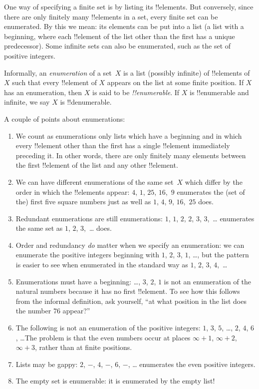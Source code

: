 \documentclass[../../../include/open-logic-section]{subfiles}
\begin{document}


One way of specifying a finite set is by listing its !!{element}s. But
conversely, since there are only finitely many !!{element}s in a set,
every finite set can be enumerated.  By this we mean: its elements can
be put into a list (a list with a beginning, where each !!{element} of
the list other than the first has a unique predecessor).  Some
infinite sets can also be enumerated, such as the set of positive
integers.

\begin{defn}[Enumeration]
Informally, an \emph{enumeration} of a set~$X$ is a list (possibly
infinite) of !!{element}s of~$X$ such that every !!{element} of $X$
appears on the list at some finite position. If $X$ has an
enumeration, then $X$ is said to be \emph{!!{enumerable}}.  If $X$ is
!!{enumerable} and infinite, we say $X$ is !!{denumerable}.
\end{defn}

\begin{explain}
A couple of points about enumerations:
\begin{enumerate}
\item We count as enumerations only lists which have a beginning and
  in which every !!{element} other than the first has a single
  !!{element} immediately preceding it.  In other words, there are
  only finitely many elements between the first !!{element} of the
  list and any other !!{element}.
\item We can have different enumerations of the same set~$X$ which
  differ by the order in which the !!{element}s appear: $4$, $1$,
  $25$, $16$,~$9$ enumerates the (set of the) first five square
  numbers just as well as $1$, $4$, $9$, $16$,~$25$ does.
\item Redundant enumerations are still enumerations: $1$, $1$, $2$,
  $2$, $3$, $3$,~\dots{} enumerates the same set as $1$, $2$,
  $3$,~\dots{} does.
\item Order and redundancy \emph{do} matter when we specify an
  enumeration: we can enumerate the positive integers beginning with
  $1$, $2$, $3$, $1$, \dots{}, but the pattern is easier to see when
  enumerated in the standard way as $1$, $2$, $3$, $4$,~\dots
\item Enumerations must have a beginning: \dots, $3$, $2$, $1$ is not
  an enumeration of the natural numbers because it has no first
  !!{element}. To see how this follows from the informal definition,
  ask yourself, ``at what position in the list does the number 76
  appear?''
\item The following is not an enumeration of the positive integers:
  $1$, $3$, $5$, \dots, $2$, $4$, $6$, \dots\@ The problem is that the
  even numbers occur at places $\infty + 1$, $\infty + 2$, $\infty +
  3$, rather than at finite positions.
\item Lists may be gappy: $2$, $-$, $4$, $-$, $6$, $-$, \dots{}
  enumerates the even positive integers.
\item The empty set is enumerable: it is enumerated by the empty list!{}
\end{enumerate}
\end{explain}
\end{document}
